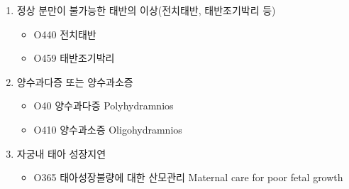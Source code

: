 \begin{enumerate}[가)]
\begin{itemize}
	\end{itemize}
\item 정상 분만이 불가능한 태반의 이상(전치태반, 태반조기박리 등)
	\begin{itemize}\tightlist
	\item O440 전치태반 
	\item O459 태반조기박리 
	\end{itemize}
\item 양수과다증 또는 양수과소증
	\begin{itemize}\tightlist
	\item O40 양수과다증 Polyhydramnios 
	\item O410 양수과소증 Oligohydramnios 
	\end{itemize}
\item 자궁내 태아 성장지연
	\begin{itemize}\tightlist
	\item O365 태아성장불량에 대한 산모관리 Maternal care for poor fetal growth
	\end{itemize}
\end{enumerate}
\prezi{\clearpage}
